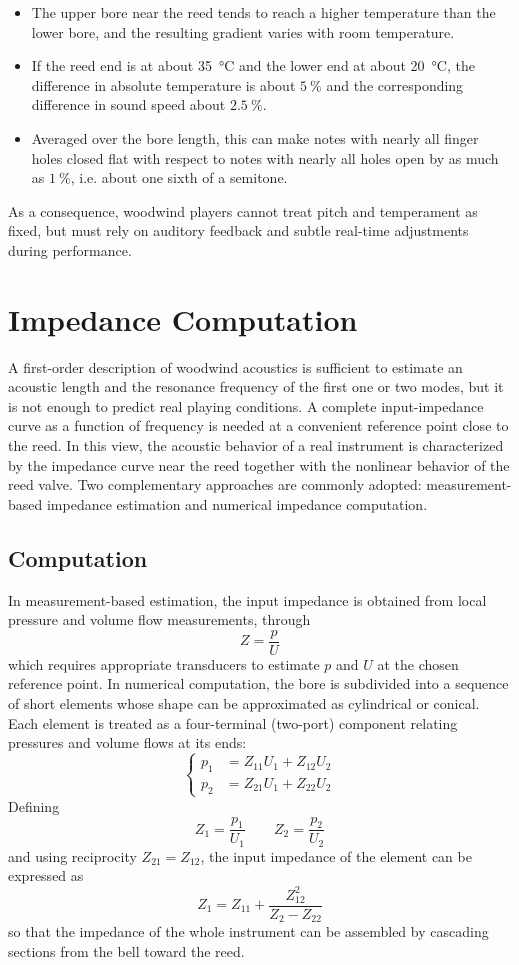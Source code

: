 \begin{itemize}
    \item The upper bore near the reed tends to reach a higher temperature than the lower bore, and the resulting gradient varies with room temperature. 
    \item If the reed end is at about \SI{35}{\celsius} and the lower end at about \SI{20}{\celsius}, the difference in absolute temperature is about \( \SI{5}{\percent} \) and the corresponding difference in sound speed about \( \SI{2.5}{\percent} \).
    \item Averaged over the bore length, this can make notes with nearly all finger holes closed flat with respect to notes with nearly all holes open by as much as \( \SI{1}{\percent} \), i.e. about one sixth of a semitone.
\end{itemize}

As a consequence, woodwind players cannot treat pitch and temperament as fixed, but must rely on auditory feedback and subtle real-time adjustments during performance.

\section{Impedance Computation}

A first-order description of woodwind acoustics is sufficient to estimate an acoustic length and the resonance frequency of the first one or two modes, but it is not enough to predict real playing conditions. A complete input-impedance curve as a function of frequency is needed at a convenient reference point close to the reed. In this view, the acoustic behavior of a real instrument is characterized by the impedance curve near the reed together with the nonlinear behavior of the reed valve. Two complementary approaches are commonly adopted: measurement-based impedance estimation and numerical impedance computation.

\subsection{Computation}

In measurement-based estimation, the input impedance is obtained from local pressure and volume flow measurements, through
\[
Z = \frac{p}{U}
\]
which requires appropriate transducers to estimate \( p \) and \( U \) at the chosen reference point. In numerical computation, the bore is subdivided into a sequence of short elements whose shape can be approximated as cylindrical or conical. Each element is treated as a four-terminal (two-port) component relating pressures and volume flows at its ends:
\[
\left\{
\begin{aligned}
p_{1} &= Z_{11}U_{1} + Z_{12}U_{2} \\
p_{2} &= Z_{21}U_{1} + Z_{22}U_{2}
\end{aligned}
\right.
\]
Defining
\[
Z_{1} = \frac{p_{1}}{U_{1}}
\qquad
Z_{2} = \frac{p_{2}}{U_{2}}
\]
and using reciprocity \( Z_{21} = Z_{12} \), the input impedance of the element can be expressed as
\[
Z_{1} = Z_{11} + \frac{Z_{12}^{2}}{Z_{2} - Z_{22}}
\]
so that the impedance of the whole instrument can be assembled by cascading sections from the bell toward the reed.

